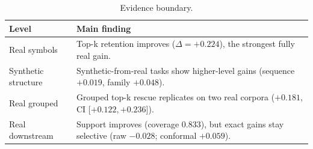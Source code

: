 \begin{table}[t]
\caption{Evidence boundary.}
\label{tab:bridge}
\centering
\footnotesize
\setlength{\tabcolsep}{4pt}
\renewcommand{\arraystretch}{1.06}
\begin{tabularx}{\columnwidth}{@{}p{1.45cm}X@{}}
\toprule
\textbf{Level} & \textbf{Main finding} \\
\midrule
Real symbols & Top-k retention improves ($\Delta=+0.224$), the strongest fully real gain. \\
Synthetic structure & Synthetic-from-real tasks show higher-level gains (sequence $+0.019$, family $+0.048$). \\
Real grouped & Grouped top-k rescue replicates on two real corpora ($+0.181$, CI [$+0.122,+0.236$]). \\
Real downstream & Support improves (coverage $0.833$), but exact gains stay selective (raw $-0.028$; conformal $+0.059$). \\
\bottomrule
\end{tabularx}
\end{table}
